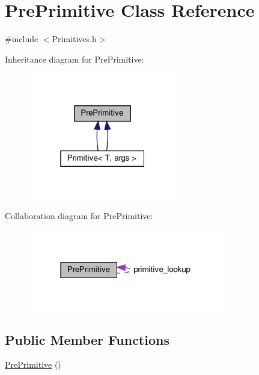 \hypertarget{struct_pre_primitive}{}\section{Pre\+Primitive Class Reference}
\label{struct_pre_primitive}


{\ttfamily \#include $<$Primitives.\+h$>$}



Inheritance diagram for Pre\+Primitive\+:\nopagebreak
\begin{figure}[H]
\begin{center}
\leavevmode
\includegraphics[width=184pt]{struct_pre_primitive__inherit__graph}
\end{center}
\end{figure}


Collaboration diagram for Pre\+Primitive\+:\nopagebreak
\begin{figure}[H]
\begin{center}
\leavevmode
\includegraphics[width=242pt]{struct_pre_primitive__coll__graph}
\end{center}
\end{figure}
\subsection*{Public Member Functions}
\begin{DoxyCompactItemize}
\item 
\hyperlink{struct_pre_primitive_a8a96c30ad34b1f19f0539eea4d0423f6}{Pre\+Primitive} ()
\end{DoxyCompactItemize}
